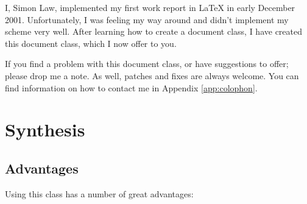 \documentclass{uw-wkrpt}
\begin{document}
I, Simon Law, implemented my first work report in \LaTeX{} in early
December 2001.  Unfortunately, I was feeling my way around and didn't
implement my scheme very well.  After learning how to create a
document class, I have created this document class, which I now offer 
to you.

If you find a problem with this document class, or have suggestions to
offer; please drop me a note.  As well, patches and fixes are always
welcome.  You can find information on how to contact me in Appendix 
\ref{app:colophon}.

\section{Synthesis}

\subsection{Advantages}
Using this class has a number of great advantages:
\end{document}
